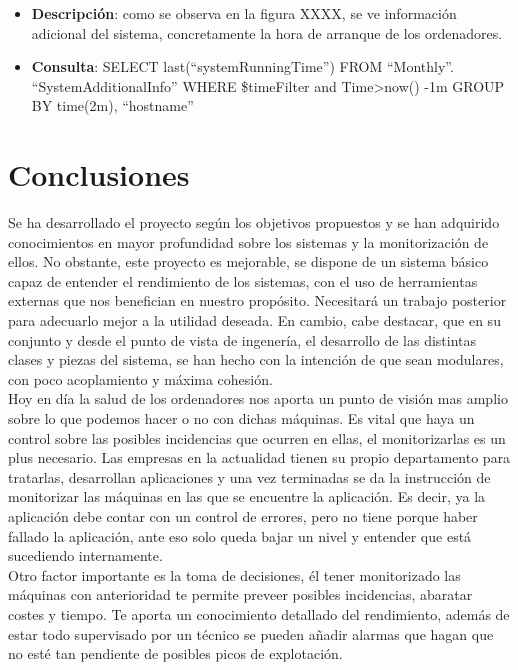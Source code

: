 \documentclass[ spanish, a4paper, 12pt, oneside]{report}
\begin{document}
\begin{itemize}
   \item \textbf{Descripción}: como se observa en la figura XXXX, se ve información adicional del sistema, concretamente la hora de arranque de los ordenadores.
   \item \textbf{Consulta}: SELECT last(``systemRunningTime'') FROM ``Monthly''. ``SystemAdditionalInfo'' WHERE \$timeFilter and Time>now() -1m GROUP BY time(2m), ``hostname''
\end{itemize}

\chapter{Conclusiones}

Se ha desarrollado el proyecto según los objetivos propuestos y se han adquirido conocimientos en mayor profundidad sobre los sistemas y la monitorización de ellos. No obstante, este proyecto es mejorable, se dispone de un sistema básico capaz de entender el rendimiento de los sistemas, con el uso de herramientas externas que nos benefician en nuestro propósito. Necesitará un trabajo posterior 
para adecuarlo mejor a la utilidad deseada. En cambio, cabe destacar, que en su conjunto y desde el punto de vista de ingenería, el desarrollo de las distintas clases y piezas del sistema, se han hecho con la intención de que sean modulares, con poco acoplamiento y máxima cohesión.\\
 
Hoy en día la salud de los ordenadores nos aporta un punto de visión mas amplio sobre lo que podemos hacer o no con dichas máquinas. Es vital que haya un control sobre las posibles incidencias que ocurren en ellas, el monitorizarlas es un plus necesario. Las empresas en la actualidad tienen su propio departamento para tratarlas, desarrollan aplicaciones y una vez terminadas 
se da la instrucción de monitorizar las máquinas en las que se encuentre la aplicación. Es decir, ya la aplicación debe contar con un control de errores, pero no tiene porque haber fallado la aplicación, ante eso solo queda bajar un nivel y entender que está sucediendo internamente.\\

Otro factor importante es la toma de decisiones, él tener monitorizado las máquinas con anterioridad te permite preveer posibles incidencias, abaratar costes y tiempo. Te aporta un conocimiento detallado del rendimiento, además de estar todo supervisado por un técnico se pueden añadir alarmas que hagan que no esté tan pendiente de posibles picos de explotación.\\
\end{document}
